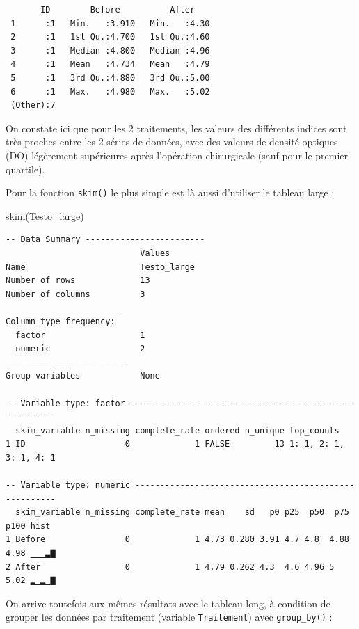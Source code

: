 \documentclass[
  a4paper,
  DIV=11,
  numbers=noendperiod,
  oneside]{scrreprt}
\newenvironment{Shaded}{}{}
\newcommand{\FunctionTok}[1]{\textcolor[rgb]{0.44,0.26,0.76}{#1}}
\newcommand{\NormalTok}[1]{\textcolor[rgb]{0.14,0.16,0.18}{#1}}
\begin{document}
\begin{verbatim}
       ID        Before          After     
 1      :1   Min.   :3.910   Min.   :4.30  
 2      :1   1st Qu.:4.700   1st Qu.:4.60  
 3      :1   Median :4.800   Median :4.96  
 4      :1   Mean   :4.734   Mean   :4.79  
 5      :1   3rd Qu.:4.880   3rd Qu.:5.00  
 6      :1   Max.   :4.980   Max.   :5.02  
 (Other):7                                 
\end{verbatim}

On constate ici que pour les 2 traitements, les valeurs des différents
indices sont très proches entre les 2 séries de données, avec des
valeurs de densité optiques (DO) légèrement supérieures après
l'opération chirurgicale (sauf pour le premier quartile).

Pour la fonction \texttt{skim()} le plus simple est là aussi d'utiliser
le tableau large :

\begin{Shaded}
\begin{Highlighting}[]
\FunctionTok{skim}\NormalTok{(Testo\_large)}
\end{Highlighting}
\end{Shaded}

\begin{verbatim}
-- Data Summary ------------------------
                           Values     
Name                       Testo_large
Number of rows             13         
Number of columns          3          
_______________________               
Column type frequency:                
  factor                   1          
  numeric                  2          
________________________              
Group variables            None       

-- Variable type: factor -------------------------------------------------------
  skim_variable n_missing complete_rate ordered n_unique top_counts            
1 ID                    0             1 FALSE         13 1: 1, 2: 1, 3: 1, 4: 1

-- Variable type: numeric ------------------------------------------------------
  skim_variable n_missing complete_rate mean    sd   p0 p25  p50  p75 p100 hist 
1 Before                0             1 4.73 0.280 3.91 4.7 4.8  4.88 4.98 ▁▁▁▃▇
2 After                 0             1 4.79 0.262 4.3  4.6 4.96 5    5.02 ▂▁▂▁▇
\end{verbatim}

On arrive toutefois aux mêmes résultats avec le tableau long, à
condition de grouper les données par traitement (variable
\texttt{Traitement}) avec \texttt{group\_by()} :
\end{document}
